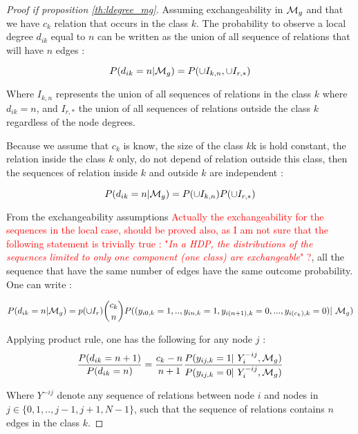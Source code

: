 \begin{proof}[Proof if proposition \ref{th:ldegree_mg}]
    Assuming exchangeability in $\mathcal{M}_g$ and that we have $c_k$ relation that occurs in the
    class $k$. The probability to observe a local degree $d_{ik}$ equal to $n$ can be written as the
    union of all sequence of relations that will have $n$ edges :

\begin{equation}
    P(d_{ik}=n | \mathcal{M}_g) = P( \cup I_{k,n}, \cup I_{r,*})
\end{equation}

Where $I_{k,n}$ represents the union of all sequences of relations in the class $k$ where
    $d_{ik} = n$, and  $I_{r,*}$ the union of all sequences of relations outside the class
    $k$ regardless of the node degrees. 

Because we assume that $c_k$ is know, the size of the class $k$k is hold constant, the
    relation inside the class $k$ only, do not depend of relation outside this class, then
    the sequences of relation inside $k$ and outside $k$ are independent : 

    \begin{equation}
        P(d_{ik}=n | \mathcal{M}_g) = P( \cup I_{k,n}) P( \cup I_{r,*})
    \end{equation}
    
    From the exchangeability assumptions \textcolor{red}{Actually the exchangeability for
    the sequences in the local case, should be proved also, as I am not sure that the
    following statement is trivially true : "\emph{In a HDP, the distributions of the
    sequences limited to only one component (one class) are exchangeable}" ?}, all the
    sequence that have the same number of edges have the same outcome probability. One can
    write : 

\begin{equation}
P(d_{ik}=n | \M_g) = p(\cup I_r) \dbinom{c_k}{n} P( (y_{i0, k}=1,..,  y_{in, k}=1,
    y_{i(n+1), k}=0,...,y_{i(c_k), k}=0) | \M_g)
\end{equation}

Applying product rule, one has the following for any node $j$ : 
\begin{equation} \label{eq:bb1}
    \frac{P(d_{ik} = n+1)}{P(d_{ik} = n)} = \frac{c_k - n}{n+1} \frac{P(y_{ij,k}=1
    | Y_i^{-ij}, \M_g)}{P(y_{ij,k}=0 | Y_i^{-ij}, \M_g)}
\end{equation}

Where $Y^{-ij}$ denote any sequence of relations between node $i$ and nodes  in $j \in \{0,1,..,j-1, j+1, N-1\}$,
such that the sequence of relations contains $n$ edges in the class $k$.


\end{proof}
